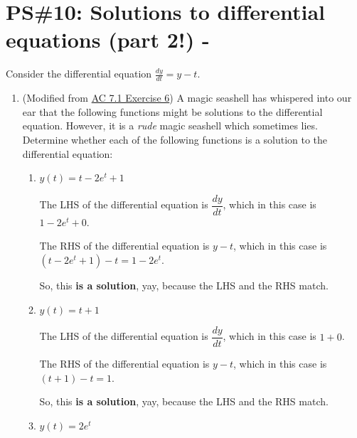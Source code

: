 
\usepackage{lscape}

%


\allowdisplaybreaks
\section{PS\#10: Solutions to differential equations (part 2!) -  }


Consider the differential equation $\displaystyle \frac{dy}{dt} = y-t$.

\begin{enumerate}[leftmargin=0pt]

\item (Modified from \href{https://activecalculus.org/single/sec-7-1-diff-eq-intro.html#mvy}{AC 7.1 Exercise 6}) A magic seashell has whispered into our ear that the following functions might be solutions to the differential equation. However, it is a \textit{rude} magic seashell which sometimes lies. Determine whether each of the following functions is a solution to the differential equation:


\begin{enumerate}
    \item $y(t) = t-2e^t+1$
    
    \begin{red}
    The LHS of the differential equation is $\dfrac{dy}{dt}$, which in this case is $1-2e^t+0$. 
    
    The RHS of the differential equation is $y-t$, which in this case is $\left(t-2e^t+1\right)-t = 1-2e^t$. 
    
    So, this \textbf{is a solution}, yay, because the LHS and the RHS match.
    \end{red}
    \item $y(t) = t+1$
    
    \begin{red}
    The LHS of the differential equation is $\dfrac{dy}{dt}$, which in this case is $1 + 0$. 
    
    The RHS of the differential equation is $y-t$, which in this case is $\left(t+1\right)-t = 1$. 
    
    So, this \textbf{is a solution}, yay, because the LHS and the RHS match.
    \end{red}

    \item $y(t) = 2e^t$


\end{enumerate}
\end{enumerate}
